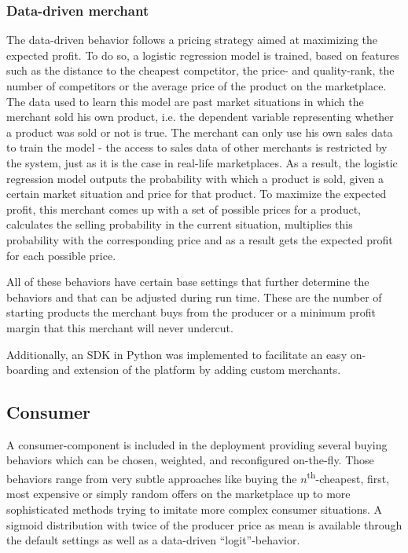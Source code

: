 %
\subsubsection{Data-driven merchant}
%
The data-driven behavior follows a pricing strategy aimed at maximizing the expected profit. To do so, a logistic regression model is trained, based on features such as the distance to the cheapest competitor, the price- and quality-rank, the number of competitors or the average price of the product on the marketplace. The data used to learn this model are past market situations in which the merchant sold his own product, i.e. the dependent variable representing whether a product was sold or not is true. The merchant can only use his own sales data to train the model - the access to sales data of other merchants is restricted by the system, just as it is the case in real-life marketplaces. As a result, the logistic regression model outputs the probability with which a product is sold, given a certain market situation and price for that product. To maximize the expected profit, this merchant comes up with a set of possible prices for a product, calculates the selling probability in the current situation, multiplies this probability with the corresponding price and as a result gets the expected profit for each possible price. 

All of these behaviors have certain base settings that further determine the behaviors and that can be adjusted during run time. These are the number of starting products the merchant buys from the producer or a minimum profit margin that this merchant will never undercut.

Additionally, an SDK in Python was implemented to facilitate an easy on-boarding and extension of the platform by adding custom merchants.

\subsection{Consumer}
\label{sec:Behaviors_Consumer}
%

A consumer-component is included in the deployment providing several buying behaviors which can be chosen, weighted, and reconfigured on-the-fly. Those behaviors range from very subtle approaches like buying the $n$\textsuperscript{th}-cheapest, first, most expensive or simply random offers on the marketplace up to more sophisticated methods trying to imitate more complex consumer situations. A sigmoid distribution with twice of the producer price as mean is available through the default settings as well as a data-driven ``logit''-behavior.

